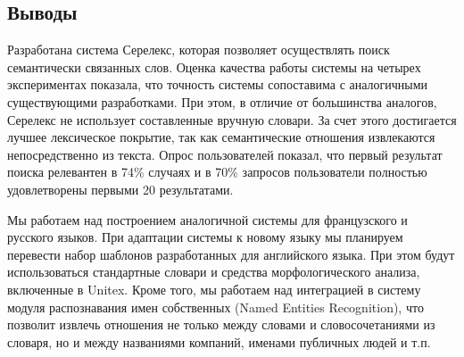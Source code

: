 \documentclass[a4paper,10pt,twoside]{article}
\begin{document}
\subsection{Выводы}

Разработана система Серелекс, которая позволяет осуществлять поиск семантически связанных слов. Оценка качества работы системы на четырех экспериментах показала, что точность системы сопоставима с аналогичными существующими разработками. При этом, в отличие от большинства аналогов, Серелекс не использует составленные вручную словари. За счет этого достигается лучшее лексическое покрытие, так как семантические отношения извлекаются непосредственно из текста. Опрос пользователей показал, что первый результат поиска релевантен в 74\% случаях и в 70\% запросов пользователи полностью удовлетворены первыми 20 результатами.   

Мы работаем над построением аналогичной системы для французского и русского языков. При адаптации системы к новому языку мы планируем перевести набор шаблонов разработанных для английского языка. При этом будут использоваться стандартные словари и средства морфологического анализа, включенные в Unitex. Кроме того, мы работаем над интеграцией в систему модуля распознавания имен собственных (Named Entities Recognition), что позволит извлечь отношения не только между словами и словосочетаниями из словаря, но и между названиями компаний, именами публичных людей и т.п. 



\end{document}
